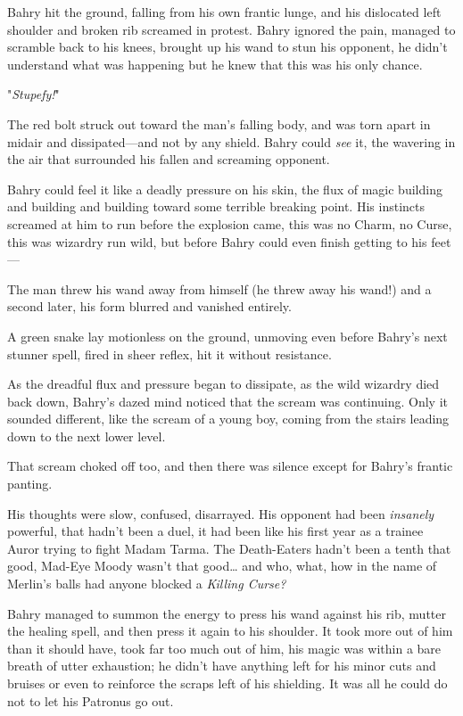 Bahry hit the ground, falling from his own frantic lunge, and his dislocated
left shoulder and broken rib screamed in protest. Bahry ignored the pain,
managed to scramble back to his knees, brought up his wand to stun his
opponent, he didn't understand what was happening but he knew that this was his
only chance.

"\emph{Stupefy!}"

The red bolt struck out toward the man's falling body, and was torn apart in
midair and dissipated---and not by any shield. Bahry could \emph{see} it, the
wavering in the air that surrounded his fallen and screaming opponent.

Bahry could feel it like a deadly pressure on his skin, the flux of magic
building and building and building toward some terrible breaking point. His
instincts screamed at him to run before the explosion came, this was no Charm,
no Curse, this was wizardry run wild, but before Bahry could even finish
getting to his feet---

The man threw his wand away from himself (he threw away his wand!) and a second
later, his form blurred and vanished entirely.

A green snake lay motionless on the ground, unmoving even before Bahry's next
stunner spell, fired in sheer reflex, hit it without resistance.

As the dreadful flux and pressure began to dissipate, as the wild wizardry died
back down, Bahry's dazed mind noticed that the scream was continuing. Only it
sounded different, like the scream of a young boy, coming from the stairs
leading down to the next lower level.

That scream choked off too, and then there was silence except for Bahry's
frantic panting.

His thoughts were slow, confused, disarrayed. His opponent had been
\emph{insanely} powerful, that hadn't been a duel, it had been like his first
year as a trainee Auror trying to fight Madam Tarma. The Death-Eaters hadn't
been a tenth that good, Mad-Eye Moody wasn't that good{\ldots} and who, what,
how in the name of Merlin's balls had anyone blocked a \emph{Killing Curse?}

Bahry managed to summon the energy to press his wand against his rib, mutter
the healing spell, and then press it again to his shoulder. It took more out of
him than it should have, took far too much out of him, his magic was within a
bare breath of utter exhaustion; he didn't have anything left for his minor
cuts and bruises or even to reinforce the scraps left of his shielding. It was
all he could do not to let his Patronus go out.

